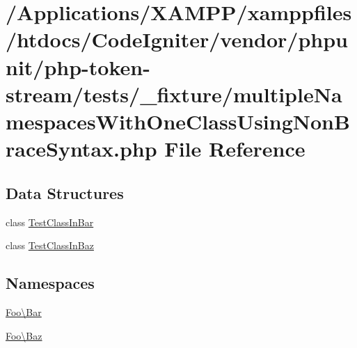 \hypertarget{multiple_namespaces_with_one_class_using_non_brace_syntax_8php}{}\section{/\+Applications/\+X\+A\+M\+P\+P/xamppfiles/htdocs/\+Code\+Igniter/vendor/phpunit/php-\/token-\/stream/tests/\+\_\+fixture/multiple\+Namespaces\+With\+One\+Class\+Using\+Non\+Brace\+Syntax.php File Reference}
\label{multiple_namespaces_with_one_class_using_non_brace_syntax_8php}
\subsection*{Data Structures}
\begin{DoxyCompactItemize}
\item 
class \mbox{\hyperlink{class_foo_1_1_bar_1_1_test_class_in_bar}{Test\+Class\+In\+Bar}}
\item 
class \mbox{\hyperlink{class_foo_1_1_baz_1_1_test_class_in_baz}{Test\+Class\+In\+Baz}}
\end{DoxyCompactItemize}
\subsection*{Namespaces}
\begin{DoxyCompactItemize}
\item 
 \mbox{\hyperlink{namespace_foo_1_1_bar}{Foo\textbackslash{}\+Bar}}
\item 
 \mbox{\hyperlink{namespace_foo_1_1_baz}{Foo\textbackslash{}\+Baz}}
\end{DoxyCompactItemize}
